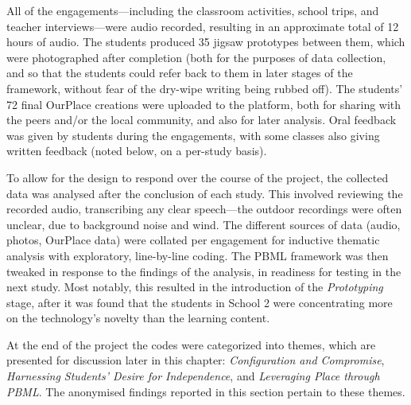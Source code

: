 All of the engagements---including the classroom activities, school trips, and teacher interviews---were audio recorded, resulting in an approximate total of 12 hours of audio. The students produced 35 jigsaw prototypes between them, which were photographed after completion (both for the purposes of data collection, and so that the students could refer back to them in later stages of the framework, without fear of the dry-wipe writing being rubbed off). The students' 72 final OurPlace creations were uploaded to the platform, both for sharing with the peers and/or the local community, and also for later analysis. Oral feedback was given by students during the engagements, with some classes also giving written feedback (noted below, on a per-study basis).

To allow for the design to respond over the course of the project, the collected data was analysed after the conclusion of each study. This involved reviewing the recorded audio, transcribing any clear speech---the outdoor recordings were often unclear, due to background noise and wind. The different sources of data (audio, photos, OurPlace data) were collated per engagement for inductive thematic analysis with exploratory, line-by-line coding. The PBML framework was then tweaked in response to the findings of the analysis, in readiness for testing in the next study. Most notably, this resulted in the introduction of the \textit{Prototyping} stage, after it was found that the students in School 2 were concentrating more on the technology's novelty than the learning content.

At the end of the project the codes were categorized into themes, which are presented for discussion later in this chapter: \textit{Configuration and Compromise}, \textit{Harnessing Students' Desire for Independence}, and \textit{Leveraging Place through PBML}. The anonymised findings reported in this section pertain to these themes.

